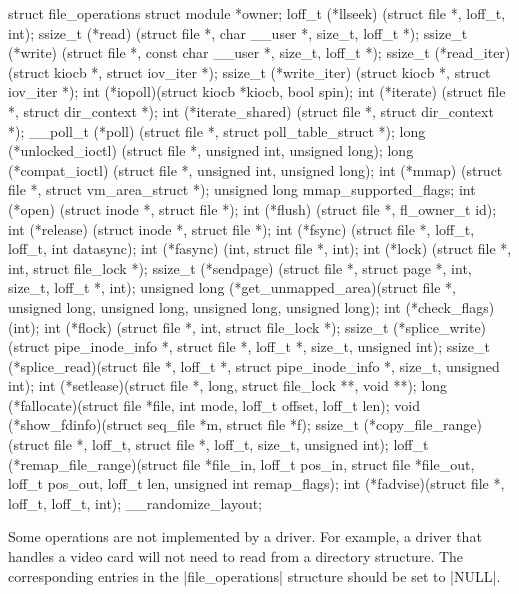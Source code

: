 \documentclass[10pt, oneside]{book}
\begin{document}
\begin{code}
struct file_operations {
    struct module *owner;
    loff_t (*llseek) (struct file *, loff_t, int);
    ssize_t (*read) (struct file *, char __user *, size_t, loff_t *);
    ssize_t (*write) (struct file *, const char __user *, size_t, loff_t *);
    ssize_t (*read_iter) (struct kiocb *, struct iov_iter *);
    ssize_t (*write_iter) (struct kiocb *, struct iov_iter *);
    int (*iopoll)(struct kiocb *kiocb, bool spin);
    int (*iterate) (struct file *, struct dir_context *);
    int (*iterate_shared) (struct file *, struct dir_context *);
    __poll_t (*poll) (struct file *, struct poll_table_struct *);
    long (*unlocked_ioctl) (struct file *, unsigned int, unsigned long);
    long (*compat_ioctl) (struct file *, unsigned int, unsigned long);
    int (*mmap) (struct file *, struct vm_area_struct *);
    unsigned long mmap_supported_flags;
    int (*open) (struct inode *, struct file *);
    int (*flush) (struct file *, fl_owner_t id);
    int (*release) (struct inode *, struct file *);
    int (*fsync) (struct file *, loff_t, loff_t, int datasync);
    int (*fasync) (int, struct file *, int);
    int (*lock) (struct file *, int, struct file_lock *);
    ssize_t (*sendpage) (struct file *, struct page *, int, size_t, loff_t *, int);
    unsigned long (*get_unmapped_area)(struct file *, unsigned long, unsigned long, unsigned long, unsigned long);
    int (*check_flags)(int);
    int (*flock) (struct file *, int, struct file_lock *);
    ssize_t (*splice_write)(struct pipe_inode_info *, struct file *, loff_t *, size_t, unsigned int);
    ssize_t (*splice_read)(struct file *, loff_t *, struct pipe_inode_info *, size_t, unsigned int);
    int (*setlease)(struct file *, long, struct file_lock **, void **);
    long (*fallocate)(struct file *file, int mode, loff_t offset,
        loff_t len);
    void (*show_fdinfo)(struct seq_file *m, struct file *f);
    ssize_t (*copy_file_range)(struct file *, loff_t, struct file *,
        loff_t, size_t, unsigned int);
    loff_t (*remap_file_range)(struct file *file_in, loff_t pos_in,
             struct file *file_out, loff_t pos_out,
             loff_t len, unsigned int remap_flags);
    int (*fadvise)(struct file *, loff_t, loff_t, int);
} __randomize_layout;
\end{code}

Some operations are not implemented by a driver.
For example, a driver that handles a video card will not need to read from a directory structure.
The corresponding entries in the \cpp|file_operations| structure should be set to \cpp|NULL|.
\end{document}
